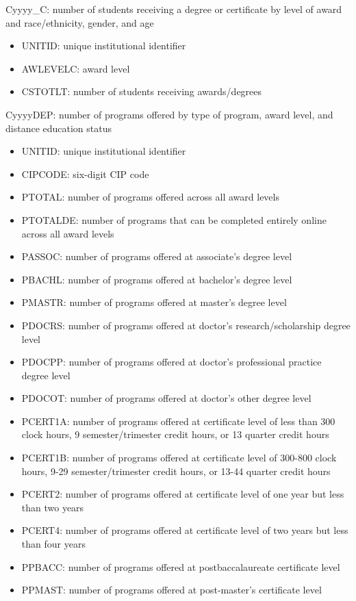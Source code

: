 \documentclass[sigconf, authorversion, nonacm]{acmart}
\begin{document}
    Cyyyy_C: number of students receiving a degree or certificate by level of award and race/ethnicity, gender, and age

    \begin{itemize}
        \item UNITID: unique institutional identifier
        \item AWLEVELC: award level
        \item CSTOTLT: number of students receiving awards/degrees
    \end{itemize}

    CyyyyDEP: number of programs offered by type of program, award level, and distance education status

    \begin{itemize}
        \item UNITID: unique institutional identifier
        \item CIPCODE: six-digit CIP code
        \item PTOTAL: number of programs offered across all award levels
        \item PTOTALDE: number of programs that can be completed entirely online across all award levels
        \item PASSOC: number of programs offered at associate's degree level
        \item PBACHL: number of programs offered at bachelor's degree level
        \item PMASTR: number of programs offered at master's degree level
        \item PDOCRS: number of programs offered at doctor's research/scholarship degree level
        \item PDOCPP: number of programs offered at doctor's professional practice degree level
        \item PDOCOT: number of programs offered at doctor's other degree level
        \item PCERT1A: number of programs offered at certificate level of less than 300 clock hours, 9 semester/trimester credit hours, or 13 quarter credit hours
        \item PCERT1B: number of programs offered at certificate level of 300-800 clock hours, 9-29 semester/trimester credit hours, or 13-44 quarter credit hours
        \item PCERT2: number of programs offered at certificate level of one year but less than two years
        \item PCERT4: number of programs offered at certificate level of two years but less than four years
        \item PPBACC: number of programs offered at postbaccalaureate certificate level
        \item PPMAST: number of programs offered at post-master's certificate level
    \end{itemize}
\end{document}
